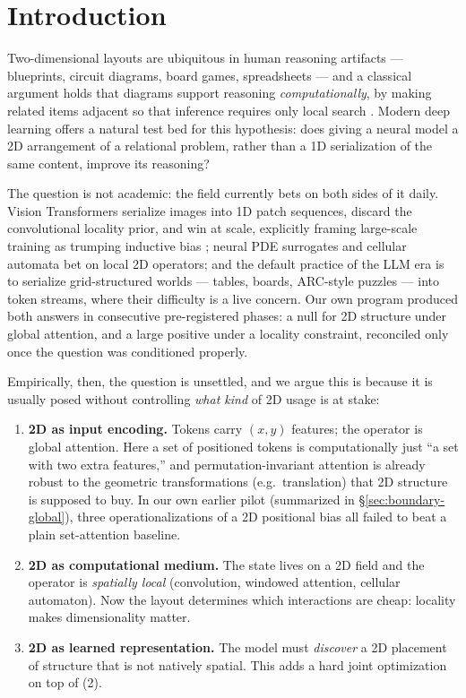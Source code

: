 \documentclass[11pt]{article}
\begin{document}
\section{Introduction}\label{sec:intro}

Two-dimensional layouts are ubiquitous in human reasoning artifacts ---
blueprints, circuit diagrams, board games, spreadsheets --- and a classical
argument holds that diagrams support reasoning \emph{computationally}, by
making related items adjacent so that inference requires only local search
\citep{larkin1987diagram}. Modern deep learning offers a natural test bed for
this hypothesis: does giving a neural model a 2D arrangement of a relational
problem, rather than a 1D serialization of the same content, improve its
reasoning?

The question is not academic: the field currently bets on both sides of it
daily. Vision Transformers serialize images into 1D patch sequences, discard
the convolutional locality prior, and win at scale, explicitly framing
large-scale training as trumping inductive bias \citep{dosovitskiy2021vit};
neural PDE surrogates and cellular automata bet on local 2D operators; and
the default practice of the LLM era is to serialize grid-structured worlds
--- tables, boards, ARC-style puzzles --- into token streams, where their
difficulty is a live concern. Our own program produced both answers in
consecutive pre-registered phases: a null for 2D structure under global
attention, and a large positive under a locality constraint, reconciled only
once the question was conditioned properly.

Empirically, then, the question is unsettled, and we argue this is because it
is usually posed without controlling \emph{what kind} of 2D usage is at
stake:

\begin{enumerate}
\item \textbf{2D as input encoding.} Tokens carry $(x, y)$ features; the
  operator is global attention. Here a set of positioned tokens is
  computationally just ``a set with two extra features,'' and
  permutation-invariant attention is already robust to the geometric
  transformations (e.g.\ translation) that 2D structure is supposed to buy. In
  our own earlier pilot (summarized in \S\ref{sec:boundary-global}),
  three operationalizations of a 2D positional bias all failed to beat a plain
  set-attention baseline.
\item \textbf{2D as computational medium.} The state lives on a 2D field and
  the operator is \emph{spatially local} (convolution, windowed attention,
  cellular automaton). Now the layout determines which interactions are cheap:
  locality makes dimensionality matter.
\item \textbf{2D as learned representation.} The model must \emph{discover} a
  2D placement of structure that is not natively spatial. This adds a hard
  joint optimization on top of (2).
\end{enumerate}
\end{document}
